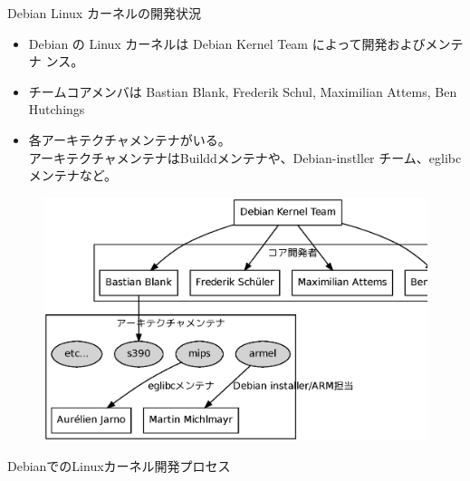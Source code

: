 \begin{frame}[containsverbatim]{Debian Linux カーネルの開発状況}
\begin{itemize}
\item Debian の Linux カーネルは Debian Kernel Team によって開発およびメンテナ
ンス。
\item チームコアメンバは Bastian Blank, Frederik Schul, Maximilian Attems,
Ben Hutchings
\item 各アーキテクチャメンテナがいる。\\
アーキテクチャメンテナはBuilddメンテナや、Debian-instller チーム、eglibc
メンテナなど。
\end{itemize}
\end{frame}

\begin{frame}[containsverbatim]
\begin{figure}[H]
\begin{center}
\includegraphics[width=1.0\hsize]{image201005/debian-kernel-team.eps}
\end{center}
\end{figure}
\end{frame}


\begin{frame}[containsverbatim]{DebianでのLinuxカーネル開発プロセス}
\end{frame}

